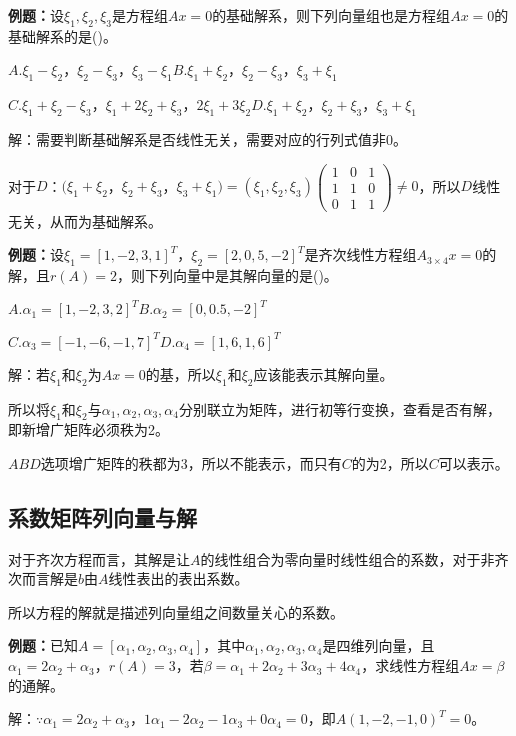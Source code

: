 \documentclass[UTF8, 12pt]{ctexart}
\begin{document}
\textbf{例题：}设$\xi_1,\xi_2,\xi_3$是方程组$Ax=0$的基础解系，则下列向量组也是方程组$Ax=0$的基础解系的是()。

$A.\xi_1-\xi_2$，$\xi_2-\xi_3$，$\xi_3-\xi_1$\qquad$B.\xi_1+\xi_2$，$\xi_2-\xi_3$，$\xi_3+\xi_1$

$C.\xi_1+\xi_2-\xi_3$，$\xi_1+2\xi_2+\xi_3$，$2\xi_1+3\xi_2$\qquad$D.\xi_1+\xi_2$，$\xi_2+\xi_3$，$\xi_3+\xi_1$

解：需要判断基础解系是否线性无关，需要对应的行列式值非0。\medskip

对于$D$：$(\xi_1+\xi_2$，$\xi_2+\xi_3$，$\xi_3+\xi_1)=(\xi_1,\xi_2,\xi_3)\left(\begin{array}{ccc}
    1 & 0 & 1 \\
    1 & 1 & 0 \\
    0 & 1 & 1
\end{array}\right)\neq0$，所以$D$线性无关，从而为基础解系。

\textbf{例题：}设$\xi_1=[1,-2,3,1]^T$，$\xi_2=[2,0,5,-2]^T$是齐次线性方程组$A_{3\times4}x=0$的解，且$r(A)=2$，则下列向量中是其解向量的是()。

$A.\alpha_1=[1,-2,3,2]^T$\qquad$B.\alpha_2=[0,0.5,-2]^T$

$C.\alpha_3=[-1,-6,-1,7]^T$\qquad$D.\alpha_4=[1,6,1,6]^T$

解：若$\xi_1$和$\xi_2$为$Ax=0$的基，所以$\xi_1$和$\xi_2$应该能表示其解向量。

所以将$\xi_1$和$\xi_2$与$\alpha_1,\alpha_2,\alpha_3,\alpha_4$分别联立为矩阵，进行初等行变换，查看是否有解，即新增广矩阵必须秩为2。

$ABD$选项增广矩阵的秩都为3，所以不能表示，而只有$C$的为2，所以$C$可以表示。

\subsection{系数矩阵列向量与解}

对于齐次方程而言，其解是让$A$的线性组合为零向量时线性组合的系数，对于非齐次而言解是$b$由$A$线性表出的表出系数。

所以方程的解就是描述列向量组之间数量关心的系数。

\textbf{例题：}已知$A=[\alpha_1,\alpha_2,\alpha_3,\alpha_4]$，其中$\alpha_1,\alpha_2,\alpha_3,\alpha_4$是四维列向量，且$\alpha_1=2\alpha_2+\alpha_3$，$r(A)=3$，若$\beta=\alpha_1+2\alpha_2+3\alpha_3+4\alpha_4$，求线性方程组$Ax=\beta$的通解。

解：$\because\alpha_1=2\alpha_2+\alpha_3$，$1\alpha_1-2\alpha_2-1\alpha_3+0\alpha_4=0$，即$A(1,-2,-1,0)^T=0$。
\end{document}
